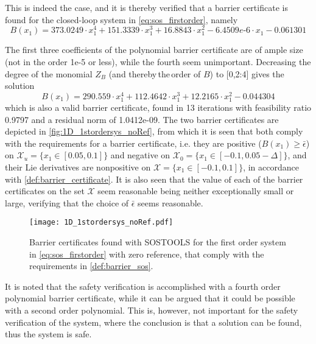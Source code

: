 \vspace{-5mm}
This is indeed the case, and it is thereby verified that a barrier certificate is found for the closed-loop system in \autoref{eq:sos_firstorder}, namely
\vspace{-2mm}
\begin{equation}
B(x_1) = 373.0249\cdot x_1^4 + 151.3339\cdot x_1^3 + 16.8843\cdot x_1^2 - 6.4509e\text{-}6\cdot x_1 - 0.061301
\end{equation}

\vspace{-3mm}
The first three coefficients of the polynomial barrier certificate are of ample size (not in the order 1e-5 or less), while the fourth seem unimportant. Decreasing the degree of the monomial $Z_B$ (and thereby\,the\,order of $B$) to [0,2:4] %
gives the solution
\begin{equation}
B(x_1) = 290.559\cdot x_1^4 + 112.4642\cdot x_1^3 + 12.2165\cdot x_1^2 - 0.044304
\end{equation}
which is also a valid barrier certificate, found in 13 iterations with feasibility ratio 0.9797 and a residual norm of 1.0412e-09.
The two barrier certificates are depicted in \autoref{fig:1D_1stordersys_noRef}, from which it is seen that  both comply with the requirements for a barrier certificate, i.e. they are positive ($B(x_1)\geq \bar{\epsilon}$) on $\mathcal{X}_u=\{x_1\in [0.05,0.1]\}$ and negative on $\mathcal{X}_0=\{x_1\in [-0.1,0.05-\Delta]\}$, and their Lie derivatives are nonpositive on $\mathcal{X}=\{x_1\in [-0.1,0.1]\}$, in accordance with \autoref{def:barrier_certificate}. It is also seen that the value of each of the barrier certificates on the set $\mathcal{X}$ seem reasonable being neither exceptionally small or large, verifying that the choice of $\bar{\epsilon}$ seems reasonable.

\begin{figure}[htbp]
\centering%
\texttt{[image: 1D\_1stordersys\_noRef.pdf]}
	\caption{Barrier certificates found with SOSTOOLS for the first order system in \autoref{eq:sos_firstorder} with zero reference,  that comply with the requirements in \autoref{def:barrier_sos}. }
	\label{fig:1D_1stordersys_noRef}
\end{figure}

It is noted that the safety verification is accomplished with a fourth order polynomial barrier certificate, while it can be argued that it could be possible with a second order polynomial. This is, however, not important for the safety verification of the system, where the conclusion is that a solution can be found, thus the system is safe.











